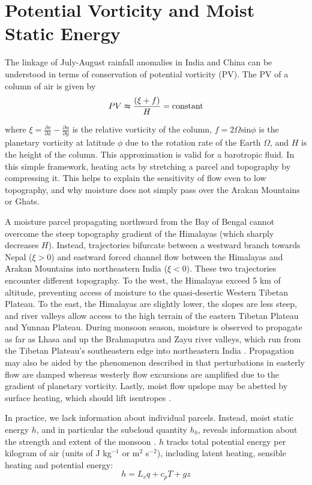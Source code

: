 \section{Potential Vorticity and Moist Static Energy}

	The linkage of July-August rainfall anomalies in India and China can be understood in terms of conservation of potential vorticity (PV). The PV of a column of air is given by
	\begin{displaymath}
			PV  \thickapprox \frac{\left(\xi+f\right)}{H}  = \mathrm{ constant}
	\end{displaymath}
	
	where $\xi = \frac{\partial v}{\partial x}-\frac{\partial u}{\partial y}$ is the relative vorticity of the column, $f=2\Omega\mathrm{sin}\phi$ is the planetary vorticity at latitude $\phi$ due to the rotation rate of the Earth $\Omega$, and $H$ is the height of the column. This approximation is valid for a barotropic fluid. In this simple framework, heating acts by stretching a parcel and topography by compressing it. This helps to explain the sensitivity of flow even to low topography, and why moisture does not simply pass over the Arakan Mountains or Ghats.
	
	A moisture parcel propagating northward from the Bay of Bengal cannot overcome the steep topography gradient of the Himalayas (which sharply decreases $H$). Instead, trajectories bifurcate between a westward branch towards Nepal ($\xi > 0$) and eastward forced channel flow between the Himalayas and Arakan Mountains into northeastern India ($\xi < 0$). These two trajectories encounter different topography. To the west, the Himalayas exceed 5 km of altitude, preventing access of moisture to the quasi-desertic Western Tibetan Plateau. To the east, the Himalayas are slightly lower, the slopes are less steep, and river valleys allow access to the high terrain of the eastern Tibetan Plateau and Yunnan Plateau. During monsoon season, moisture is observed to propagate as far as Lhasa and up the Brahmaputra and Zayu river valleys, which run from the Tibetan Plateau's southeastern edge into northeastern India \citep{Gao2011,Yang2011}. Propagation may also be aided by the phenomenon described in \cite{Holton2004} that perturbations in easterly flow are damped whereas westerly flow excursions are amplified due to the gradient of planetary vorticity. Lastly, moist flow upslope may be abetted by surface heating, which should lift isentropes \citep{Molnar1999,Prive2007a}. 
	
	In practice, we lack information about individual parcels. Instead, moist static energy $h$, and in particular the subcloud quantity $h_b$, reveals information about the strength and extent of the monsoon \citep{Prive2007,Prive2007a}. $h$ tracks total potential energy per kilogram of air (units of J kg$^{-1}$ or m$^2$ s$^{-2}$), including latent heating, sensible heating and potential energy:
	\begin{displaymath}
			h= L_v q+c_p T+gz
	\end{displaymath}
		
